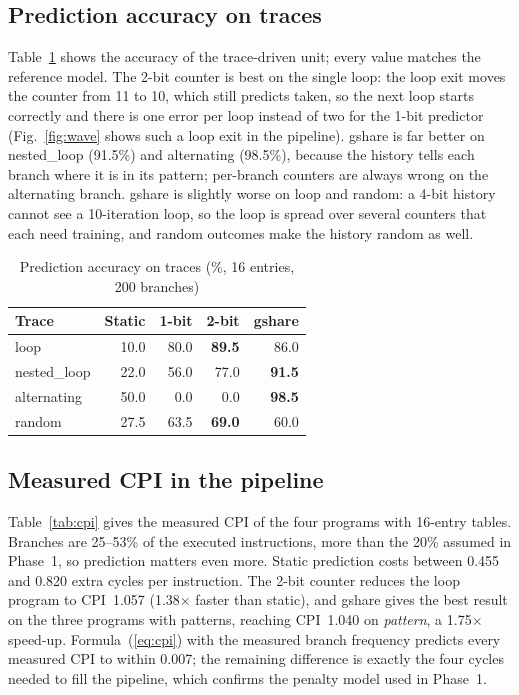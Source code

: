 \documentclass[conference]{IEEEtran}
\begin{document}
\subsection{Prediction accuracy on traces}
Table~\ref{tab:acc} shows the accuracy of the trace-driven unit; every value matches the
reference model. The 2-bit counter is best on the single loop: the loop exit moves the counter
from 11 to 10, which still predicts taken, so the next loop starts correctly and there is one
error per loop instead of two for the 1-bit predictor (Fig.~\ref{fig:wave} shows such a loop exit
in the pipeline). gshare is far better on nested\_loop (91.5\%) and alternating
(98.5\%), because the history tells each branch where it is in its pattern; per-branch counters
are always wrong on the alternating branch. gshare is slightly worse on loop and random: a 4-bit
history cannot see a 10-iteration loop, so the loop is spread over several counters that each
need training, and random outcomes make the history random as well.

\begin{table}[!t]
\caption{Prediction accuracy on traces (\%, 16 entries, 200 branches)}
\label{tab:acc}
\centering
\small
\begin{tabular}{@{}lrrrr@{}}
\toprule
Trace & Static & 1-bit & 2-bit & gshare \\
\midrule
loop        & 10.0 & 80.0 & \textbf{89.5} & 86.0 \\
nested\_loop & 22.0 & 56.0 & 77.0 & \textbf{91.5} \\
alternating & 50.0 &  0.0 &  0.0 & \textbf{98.5} \\
random      & 27.5 & 63.5 & \textbf{69.0} & 60.0 \\
\bottomrule
\end{tabular}
\end{table}

\subsection{Measured CPI in the pipeline}
Table~\ref{tab:cpi} gives the measured CPI of the four programs with 16-entry tables. Branches
are 25--53\% of the executed instructions, more than the 20\% assumed in Phase~1, so prediction
matters even more. Static prediction costs between 0.455 and 0.820 extra cycles per instruction.
The 2-bit counter reduces the loop program to CPI~1.057 (1.38$\times$ faster than static), and
gshare gives the best result on the three programs with patterns, reaching CPI~1.040 on
\emph{pattern}, a 1.75$\times$ speed-up. Formula~(\ref{eq:cpi}) with the measured branch
frequency predicts every measured CPI to within 0.007; the remaining difference is exactly the
four cycles needed to fill the pipeline, which confirms the penalty model used in Phase~1.
\end{document}
